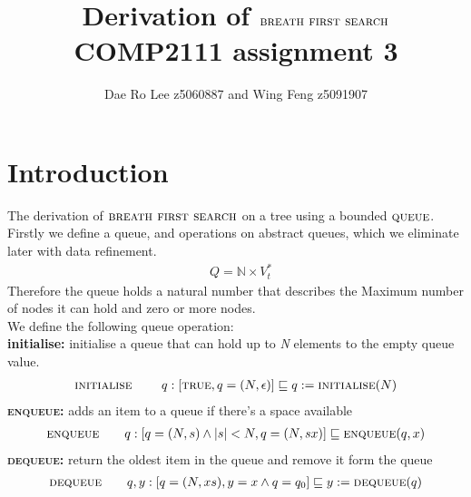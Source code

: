 \documentclass[headings=small,a4paper,12pt]{scrartcl}
\title{Derivation of $\bfs$\\
\large COMP2111 assignment 3}
\author{Dae Ro Lee z5060887 and Wing Feng z5091907}
\newcommand{\bfs}{\textsc{breath first search}\xspace}
\newcommand{\qu}{\textsc{queue}\xspace}
\newcommand{\enq}{\textsc{enqueue}\xspace}
\newcommand{\deq}{\textsc{dequeue}\xspace}
\newcommand{\ini}{\textsc{initialise}\xspace}
\begin{document}
\maketitle
%
\section{Introduction}
\label{sec:introduction}
The derivation of $\bfs$ on a tree using a bounded $\qu$.\\ 
%
Firstly we define a queue, and operations on abstract queues, which we eliminate later with data refinement.
\begin{align*}
    &Q= \mathbb{N}\times V^*_t
\end{align*}
Therefore the queue holds a natural number that describes the Maximum number of nodes it can hold and zero or more nodes.\\
We define the following queue operation:\\
\textbf{initialise:} initialise a queue that can hold up to \textit{N} elements to the empty queue value.
\begin{align*} 
  \ini\qquad~q :[\True, q = (N,\epsilon)] \isrefinedby q\Ass\ini(N)
\end{align*}
\textbf{\enq:} adds an item to a queue if there's a space available 
\begin{align*}
  \enq\qquad q:[q=(N,s)\And |s| < N, q=(N,sx)]\isrefinedby \enq(q,x)
\end{align*}
\textbf{\deq:} return the oldest item in the queue and remove it form the queue\\
\begin{align*}
  \deq\qquad q,y:[q = (N,xs), y = x \And q = q_0] \isrefinedby y \Ass \deq(q) 
\end{align*}
%
\end{document}
